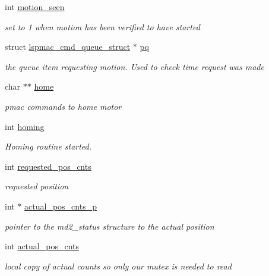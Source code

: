 \begin{DoxyCompactItemize}
int \hyperlink{structlspmac__motor__struct_a68c471836f52707fa8582f7860cf500f}{motion\-\_\-seen}
\begin{DoxyCompactList}\small\item\em set to 1 when motion has been verified to have started \end{DoxyCompactList}\item 
struct \hyperlink{structlspmac__cmd__queue__struct}{lspmac\-\_\-cmd\-\_\-queue\-\_\-struct} $\ast$ \hyperlink{structlspmac__motor__struct_ae0a0c9264f49f51bf72168c3b62f8723}{pq}
\begin{DoxyCompactList}\small\item\em the queue item requesting motion. Used to check time request was made \end{DoxyCompactList}\item 
char $\ast$$\ast$ \hyperlink{structlspmac__motor__struct_a073246b8878d75615b0536301b343f3d}{home}
\begin{DoxyCompactList}\small\item\em pmac commands to home motor \end{DoxyCompactList}\item 
int \hyperlink{structlspmac__motor__struct_aa74108855693f94fc2ff76333c9fb6ac}{homing}
\begin{DoxyCompactList}\small\item\em Homing routine started. \end{DoxyCompactList}\item 
int \hyperlink{structlspmac__motor__struct_a6e8dc9c11dc52a439fe9837230f93ce2}{requested\-\_\-pos\-\_\-cnts}
\begin{DoxyCompactList}\small\item\em requested position \end{DoxyCompactList}\item 
int $\ast$ \hyperlink{structlspmac__motor__struct_a312047bb71def5cd2443fecd875eaea5}{actual\-\_\-pos\-\_\-cnts\-\_\-p}
\begin{DoxyCompactList}\small\item\em pointer to the md2\-\_\-status structure to the actual position \end{DoxyCompactList}\item 
int \hyperlink{structlspmac__motor__struct_ae5c7aea45b9637a1817be246688fd980}{actual\-\_\-pos\-\_\-cnts}
\begin{DoxyCompactList}\small\item\em local copy of actual counts so only our mutex is needed to read \end{DoxyCompactList}\item 
$$
\end{DoxyCompactItemize}
